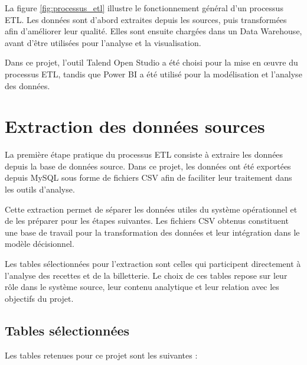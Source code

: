 \documentclass[12pt,a4paper]{report}
\begin{document}
La figure \ref{fig:processus_etl} illustre le fonctionnement général d’un processus ETL. Les données sont d’abord extraites depuis les sources, puis transformées afin d’améliorer leur qualité. Elles sont ensuite chargées dans un Data Warehouse, avant d’être utilisées pour l’analyse et la visualisation.

Dans ce projet, l’outil Talend Open Studio a été choisi pour la mise en œuvre du processus ETL, tandis que Power BI a été utilisé pour la modélisation et l’analyse des données.


\section{Extraction des données sources}

La première étape pratique du processus ETL consiste à extraire les données depuis la base de données source. Dans ce projet, les données ont été exportées depuis MySQL sous forme de fichiers CSV afin de faciliter leur traitement dans les outils d’analyse.

Cette extraction permet de séparer les données utiles du système opérationnel et de les préparer pour les étapes suivantes. Les fichiers CSV obtenus constituent une base de travail pour la transformation des données et leur intégration dans le modèle décisionnel.

Les tables sélectionnées pour l’extraction sont celles qui participent directement à l’analyse des recettes et de la billetterie. Le choix de ces tables repose sur leur rôle dans le système source, leur contenu analytique et leur relation avec les objectifs du projet.


\subsection{Tables sélectionnées}

Les tables retenues pour ce projet sont les suivantes :
\end{document}
